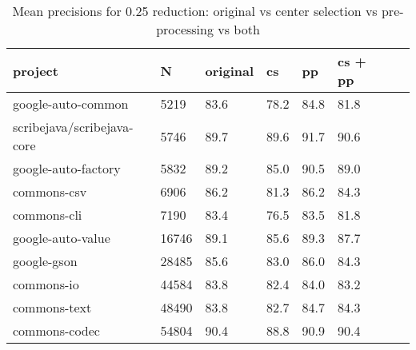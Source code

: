 \documentclass[twoside]{uva-inf-bachelor-thesis}
\begin{document}
\begin{table}[h]
    \centering
    \begin{tabular}{|l|l|l|l|l|l|l|l|}
    \hline
        project & N &original & cs & pp & cs + pp \\ \hline
        google-auto-common & 5219 & 83.6 & 78.2 & 84.8 & 81.8 \\ \hline
        scribejava/scribejava-core & 5746 & 89.7 & 89.6 & 91.7 & 90.6 \\ \hline
        google-auto-factory & 5832 & 89.2 & 85.0 & 90.5 &  89.0 \\ \hline
        commons-csv & 6906 & 86.2 & 81.3 & 86.2 & 84.3 \\ \hline
        commons-cli & 7190 & 83.4 & 76.5 & 83.5 & 81.8 \\ \hline
        google-auto-value & 16746 & 89.1 & 85.6 & 89.3 & 87.7 \\ \hline
        google-gson & 28485 & 85.6 & 83.0 & 86.0 & 84.3 \\ \hline
        commons-io & 44584 & 83.8 & 82.4 & 84.0 & 83.2 \\ \hline
        commons-text & 48490 & 83.8 & 82.7 & 84.7 & 84.3 \\ \hline
        commons-codec & 54804 & 90.4 & 88.8 & 90.9 & 90.4 \\ \hline
    \end{tabular}
    \label{tab:025CMT}
\caption{Mean precisions for 0.25 reduction: original vs center selection vs pre-processing vs both}
\end{table}
\end{document}
